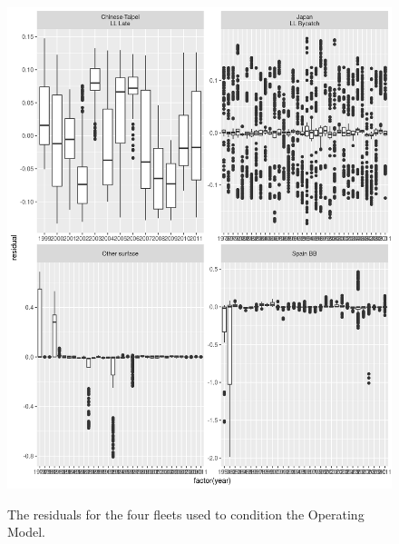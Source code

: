 \documentclass[%
nonumbib,      %
%
]{nrc1}                          %
\begin{document}
\begin{figure}[htbp]
\centering
\includegraphics[width=6in]{oem-dev.png}
\label{fig:oem-devs}
\caption{The residuals for the four fleets used to condition the Operating Model.}
\end{figure}
\end{document}
